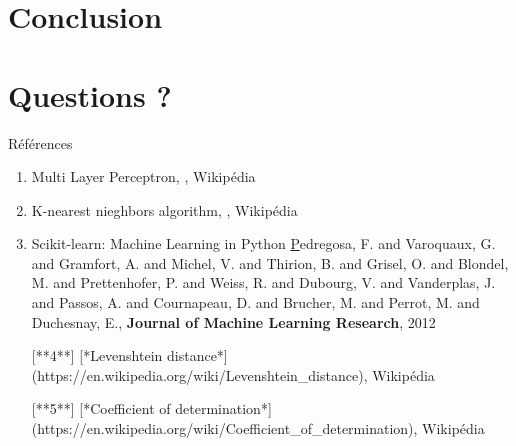 \documentclass{beamer}
\begin{document}
{\section*{Conclusion}}

{\section*{Questions ?}}

\begin{frame}{Références}
    \begin{enumerate}
        \item Multi Layer Perceptron, \href{https://en.wikipedia.org/wiki/Multilayer_perceptron}{}, Wikipédia

        \item K-nearest nieghbors algorithm, \href{https://en.wikipedia.org/wiki/K-nearest_neighbors_algorithm}{}, Wikipédia

        \item Scikit-learn: Machine Learning in Python \href{https://scikit-learn.org/stable/} Pedregosa, F. and Varoquaux, G. and Gramfort, A. and Michel, V. and Thirion, B. and Grisel, O. and Blondel, M. and Prettenhofer, P. and Weiss, R. and Dubourg, V. and Vanderplas, J. and Passos, A. and Cournapeau, D. and Brucher, M. and Perrot, M. and Duchesnay, E., \textbf{Journal of Machine Learning Research}, 2012

[**4**] [*Levenshtein distance*](https://en.wikipedia.org/wiki/Levenshtein_distance), Wikipédia

[**5**] [*Coefficient of determination*](https://en.wikipedia.org/wiki/Coefficient_of_determination), Wikipédia
    \end{enumerate}
\end{frame}
\end{document}
